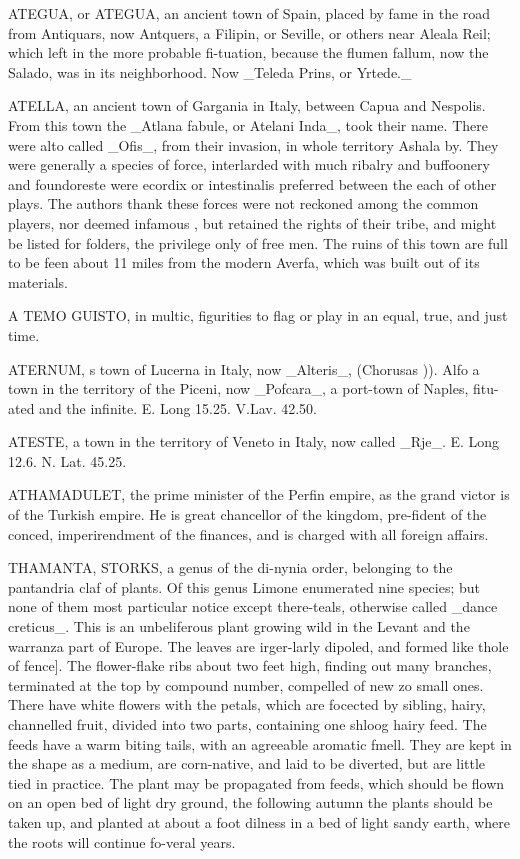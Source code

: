 ATEGUA, or ATEGUA, an ancient town of Spain, placed by fame in the road from Antiquars, now Antquers, a Filipin, or Seville, or others near Aleala Reil; which left in the more probable fi-tuation, because the flumen fallum, now the Salado, was in its neighborhood. Now \_Teleda Prins, or Yrtede.\_\par\medskip
ATELLA, an ancient town of Gargania in Italy, between Capua and Nespolis. From this town the \_Atlana fabule, or Atelani Inda\_, took their name. There were alto called \_Ofis\_, from their invasion, in whole territory Ashala by. They were generally a species of force, interlarded with much ribalry and buffoonery and foundoreste were ecordix or intestinalis preferred between the each of other plays. The authors thank these forces were not reckoned among the common players, nor deemed infamous , but retained the rights of their tribe, and might be listed for folders, the privilege only of free men. The ruins of this town are full to be feen about 11 miles from the modern Averfa, which was built out of its materials.\par\medskip
A TEMO GUISTO, in multic, figurities to flag or play in an equal, true, and just time.\par\medskip
ATERNUM, s town of Lucerna in Italy, now \_Alteris\_, (Chorusas )). Alfo a town in the territory of the Piceni, now \_Pofcara\_, a port-town of Naples, fitu-ated and the infinite. E. Long 15.25. V.Lav. 42.50.\par\medskip
ATESTE, a town in the territory of Veneto in Italy, now called \_Rje\_. E. Long 12.6. N. Lat. 45.25.\par\medskip
ATHAMADULET, the prime minister of the Perfin empire, as the grand victor is of the Turkish empire. He is great chancellor of the kingdom, pre-fident of the conced, imperirendment of the finances, and is charged with all foreign affairs.\par\medskip
THAMANTA, STORKS, a genus of the di-nynia order, belonging to the pantandria claf of plants. Of this genus Limone enumerated nine species; but none of them most particular notice except there-teals, otherwise called \_dance creticus\_. This is an unbeliferous plant growing wild in the Levant and the warranza part of Europe. The leaves are irger-larly dipoled, and formed like thole of fence]. The flower-flake ribs about two feet high, finding out many branches, terminated at the top by compound number, compelled of new zo small ones. There have white flowers with the petals, which are focected by sibling, hairy, channelled fruit, divided into two parts, containing one shloog hairy feed. The feeds have a warm biting tails, with an agreeable aromatic fmell. They are kept in the shape as a medium, are corn-native, and laid to be diverted, but are little tied in practice. The plant may be propagated from feeds, which should be flown on an open bed of light dry ground, the following autumn the plants should be taken up, and planted at about a foot dilness in a bed of light sandy earth, where the roots will continue fo-veral years.\par\medskip
